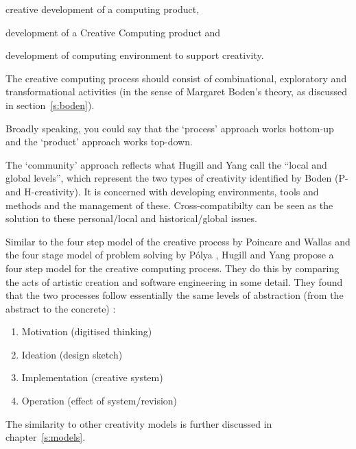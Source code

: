 \begin{description}[leftmargin=2.4cm]
  \item [Process] creative development of a computing product,
  \item [Product] development of a Creative Computing product and
  \item [Community] development of computing environment to support creativity.
\end{description}

The creative computing process should consist of combinational, exploratory and transformational activities (in the sense of Margaret Boden’s theory, as discussed in section~\ref{s:boden}).

Broadly speaking, you could say that the `process' approach works bottom-up and the `product' approach works top-down.

The `community' approach reflects what Hugill and Yang call the ``local and global levels'', which represent the two types of creativity identified by Boden (P- and H-creativity). It is concerned with developing environments, tools and methods and the management of these. Cross-compatibilty can be seen as the solution to these personal/local and historical/global issues.

Similar to the four step model of the creative process by Poincare and Wallas \autocite*{Poincare2001, Wallas1926} and the four stage model of problem solving by P{\'o}lya \autocite*{Polya1957}, Hugill and Yang propose a four step model for the creative computing process. They do this by comparing the acts of artistic creation and software engineering in some detail. They found that the two processes follow essentially the same levels of abstraction (from the abstract to the concrete) \autocite*{Hugill2013c}:

\begin{enumerate}
  \item Motivation (digitised thinking)
  \item Ideation (design sketch)
  \item Implementation (creative system)
  \item Operation (effect of system/revision)
\end{enumerate}

The similarity to other creativity models is further discussed in chapter~\ref{s:models}.


